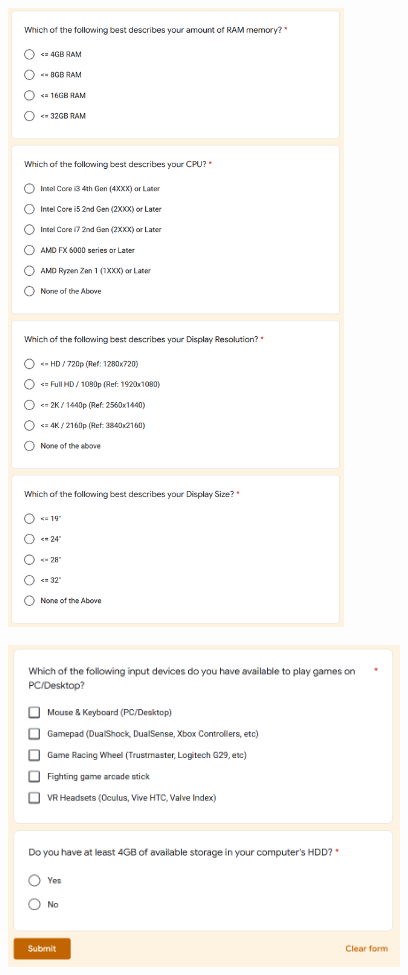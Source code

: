 \begin{figure}[!ht]
    \begin{center}
        \includegraphics[width=24em]{figures/fig-experiment-requirements-survey-pt2.png}
    \end{center}
\end{figure}

\begin{figure}[!ht]
    \begin{center}
        \includegraphics[width=28em]{figures/fig-experiment-requirements-survey-pt3.png}
    \end{center}
\end{figure}

